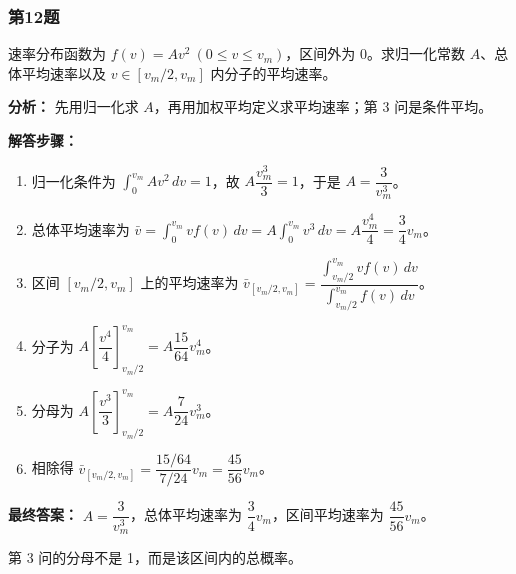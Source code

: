 \documentclass[12pt,a4paper]{ctexart}
\begin{document}
\subsubsection*{第12题}
\begin{tcolorbox}[colback=gray!2!white,colframe=black!60,title={题目}]
速率分布函数为 \(f(v)=Av^2\ (0\le v\le v_m)\)，区间外为 0。求归一化常数 \(A\)、总体平均速率以及 \(v\in[v_m/2,v_m]\) 内分子的平均速率。\par
\end{tcolorbox}
\begin{tcolorbox}[colback=blue!2!white,colframe=blue!55!black,title={完整答案}]
\textbf{分析：}
先用归一化求 \(A\)，再用加权平均定义求平均速率；第 3 问是条件平均。\par
\textbf{解答步骤：}
\begin{enumerate}
\item 归一化条件为 \(\int_0^{v_m}Av^2\,dv=1\)，故 \(A\dfrac{v_m^3}{3}=1\)，于是 \(A=\dfrac{3}{v_m^3}\)。
\item 总体平均速率为 \(\bar v=\int_0^{v_m}vf(v)\,dv=A\int_0^{v_m}v^3\,dv=A\dfrac{v_m^4}{4}=\dfrac34 v_m\)。
\item 区间 \([v_m/2,v_m]\) 上的平均速率为 \(\bar v_{[v_m/2,v_m]}=\dfrac{\int_{v_m/2}^{v_m}vf(v)\,dv}{\int_{v_m/2}^{v_m}f(v)\,dv}\)。
\item 分子为 \(A\left[\dfrac{v^4}{4}\right]_{v_m/2}^{v_m}=A\dfrac{15}{64}v_m^4\)。
\item 分母为 \(A\left[\dfrac{v^3}{3}\right]_{v_m/2}^{v_m}=A\dfrac{7}{24}v_m^3\)。
\item 相除得 \(\bar v_{[v_m/2,v_m]}=\dfrac{15/64}{7/24}v_m=\dfrac{45}{56}v_m\)。
\end{enumerate}
\textbf{最终答案：}
\(A=\dfrac{3}{v_m^3}\)，总体平均速率为 \(\dfrac34 v_m\)，区间平均速率为 \(\dfrac{45}{56}v_m\)。\par
\end{tcolorbox}
\begin{tcolorbox}[colback=red!2!white,colframe=red!55!black,title={易错点}]
第 3 问的分母不是 1，而是该区间内的总概率。\par
\end{tcolorbox}
\end{document}
